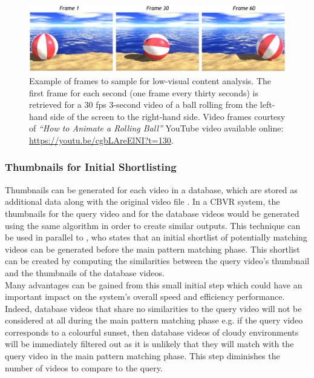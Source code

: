 \begin{figure}[h]
\centerline{\includegraphics[width=\textwidth]{figures/litsurvey/ball_rolling.jpg}}
\caption{\label{fig:rolling_ball}Example of frames to sample for low-visual content analysis. The first frame for each second (one frame every thirty seconds) is retrieved for a 30 fps 3-second video of a ball rolling from the left-hand side of the screen to the right-hand side. Video frames courtesy of \textit{``How to Animate a Rolling Ball''} YouTube video available online: \url{https://youtu.be/cgbLAreElNI?t=130}.}
\end{figure}

\subsubsection{Thumbnails for Initial Shortlisting}

Thumbnails can be generated for each video in a database, which are stored as additional data along with the original video file \cite{okabe2018animating}. In a CBVR system, the thumbnails for the query video and for the database videos would be generated using the same algorithm in order to create similar outputs. This technique can be used in parallel to \cite{araujo2017i2v}, who states that an initial shortlist of potentially matching videos can be generated before the main pattern matching phase. This shortlist can be created by computing the similarities between the query video's thumbnail and the thumbnails of the database videos.\\

Many advantages can be gained from this small initial step which could have an important impact on the system's overall speed and efficiency performance. Indeed, database videos that share no similarities to the query video will not be considered at all during the main pattern matching phase e.g. if the query video corresponds to a colourful sunset, then database videos of cloudy environments will be immediately filtered out as it is unlikely that they will match with the query video in the main pattern matching phase. This step diminishes the number of videos to compare to the query.\\

